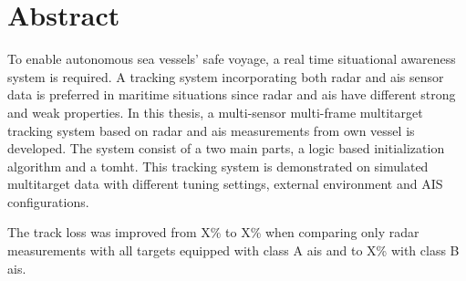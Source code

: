 
\section*{\huge Abstract}
\hfill
\noindent

To enable autonomous sea vessels' safe voyage, a real time situational awareness system is required. A tracking system incorporating both radar and \gls{ais} sensor data is preferred in maritime situations since radar and \gls{ais} have different strong and weak properties. In this thesis, a multi-sensor multi-frame multitarget tracking system based on radar and \gls{ais} \glspl{measurement} from own vessel is developed. The system consist of a two main parts, a logic based initialization algorithm and a \gls{tomht}. This tracking system is demonstrated on simulated multitarget data with different tuning settings, external environment and AIS configurations.

The track loss was improved from X\% to X\% when comparing only radar measurements with all targets equipped with class A \gls{ais} and to X\% with class B \gls{ais}.